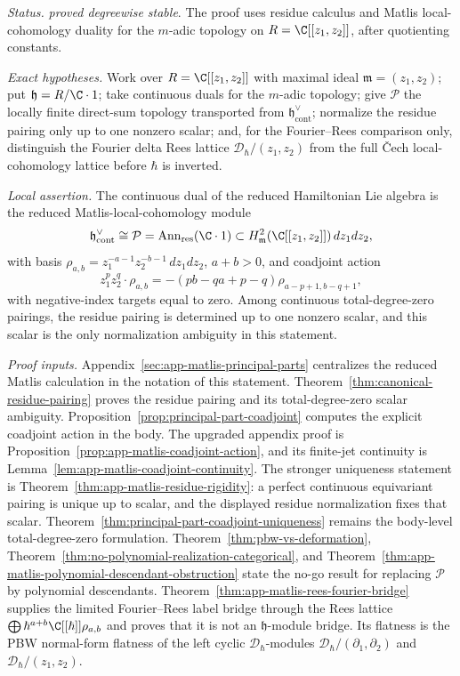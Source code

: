 \begin{stmt}\label{thm:lane-principal-parts}
  \emph{Status.} \emph{proved degreewise stable}.  The proof uses
  residue calculus and Matlis local-cohomology duality for the
  \(m\)-adic topology on \(R=\C[[z_1,z_2]]\), after quotienting
  constants.

  \emph{Exact hypotheses.} Work over \(R=\C[[z_1,z_2]]\) with maximal
  ideal \(\mathfrak m=(z_1,z_2)\); put
  \(\mathfrak h=R/\C\cdot1\); take continuous duals for the
  \(m\)-adic topology; give \(\mathcal P\) the locally finite
  direct-sum topology transported from
  \(\mathfrak h^\vee_{\mathrm{cont}}\); normalize the residue pairing
  only up to one nonzero scalar; and, for the Fourier--Rees comparison
  only, distinguish the Fourier delta Rees lattice
  \(\mathcal D_\hbar/(z_1,z_2)\) from the full \v{C}ech
  local-cohomology lattice before \(\hbar\) is inverted.

  \emph{Local assertion.} The continuous dual of the reduced Hamiltonian
  Lie algebra is the reduced Matlis-local-cohomology module
  \[
    \mathfrak h^\vee_{\mathrm{cont}}
    \cong
    \mathcal P
    =
    \operatorname{Ann}_{\mathrm{res}}(\C\cdot1)
    \subset
    H^2_{\mathfrak m}(\C[[z_1,z_2]])\,dz_1dz_2,
  \]
  with basis
  \(\rho_{a,b}=z_1^{-a-1}z_2^{-b-1}\,dz_1dz_2\), \(a+b>0\), and
  coadjoint action
  \[
    z_1^p z_2^q\cdot\rho_{a,b}
    =
    -(pb-qa+p-q)\rho_{a-p+1,b-q+1},
  \]
  with negative-index targets equal to zero.  Among continuous
  total-degree-zero pairings, the residue pairing is determined up to one
  nonzero scalar, and this scalar is the only normalization ambiguity in
  this statement.

  \emph{Proof inputs.}
  Appendix~\ref{sec:app-matlis-principal-parts} centralizes the
  reduced Matlis calculation in the notation of this statement.
  Theorem~\ref{thm:canonical-residue-pairing} proves the residue
  pairing and its total-degree-zero scalar ambiguity.
  Proposition~\ref{prop:principal-part-coadjoint} computes the explicit
  coadjoint action in the body.  The upgraded appendix proof is
  Proposition~\ref{prop:app-matlis-coadjoint-action}, and its
  finite-jet continuity is Lemma~\ref{lem:app-matlis-coadjoint-continuity}.
  The stronger uniqueness statement is
  Theorem~\ref{thm:app-matlis-residue-rigidity}: a perfect continuous
  equivariant pairing is unique up to scalar, and the displayed residue
  normalization fixes that scalar.  Theorem~\ref{thm:principal-part-coadjoint-uniqueness}
  remains the body-level total-degree-zero formulation.
  Theorem~\ref{thm:pbw-vs-deformation},
  Theorem~\ref{thm:no-polynomial-realization-categorical}, and
  Theorem~\ref{thm:app-matlis-polynomial-descendant-obstruction} state
  the no-go result for replacing \(\mathcal P\) by polynomial
  descendants.
  Theorem~\ref{thm:app-matlis-rees-fourier-bridge} supplies the limited
  Fourier--Rees label bridge through the Rees lattice
  \(\bigoplus\hbar^{a+b}\C[[\hbar]]\rho_{a,b}\) and proves that it is not
  an \(\mathfrak h\)-module bridge.  Its flatness is the PBW normal-form
  flatness of the left cyclic \(\mathcal D_\hbar\)-modules
  \(\mathcal D_\hbar/(\partial_1,\partial_2)\) and
  \(\mathcal D_\hbar/(z_1,z_2)\).


\end{stmt}
